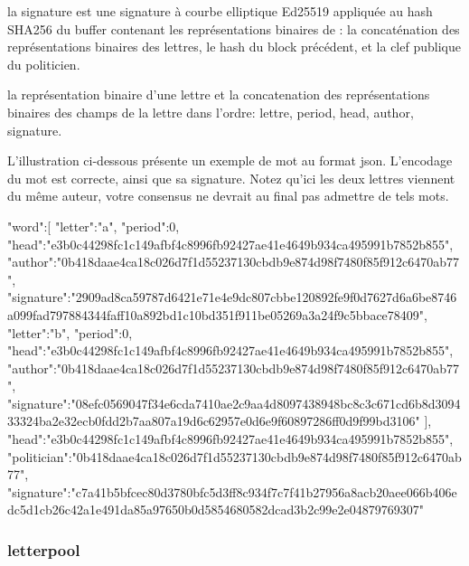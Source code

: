 \documentclass{article}
\begin{document}
 la signature est une signature à courbe elliptique Ed25519 appliquée
 au hash SHA256 du buffer contenant les représentations binaires de :
 la concaténation des représentations binaires des lettres, le hash du
 block précédent, et la clef publique du politicien.

 la représentation binaire d'une lettre et la concatenation des
 représentations binaires des champs de la lettre dans l'ordre:
 lettre, period, head, author, signature.

 L'illustration ci-dessous présente un exemple de mot au
 format json. L'encodage du mot est correcte, ainsi que sa
 signature. Notez qu'ici les deux lettres viennent du même auteur,
 votre consensus ne devrait au final pas admettre de tels mots.

\begin{jsonMessage}
   { "word":[ { "letter":"a", "period":0,
       "head":"e3b0c44298fc1c149afbf4c8996fb92427ae41e4649b934ca495991b7852b855",
       "author":"0b418daae4ca18c026d7f1d55237130cbdb9e874d98f7480f85f912c6470ab77",
       "signature":"2909ad8ca59787d6421e71e4e9dc807cbbe120892fe9f0d7627d6a6be8746a099fad797884344faff10a892bd1c10bd351f911be05269a3a24f9c5bbace78409"},
     { "letter":"b", "period":0,
       "head":"e3b0c44298fc1c149afbf4c8996fb92427ae41e4649b934ca495991b7852b855",
       "author":"0b418daae4ca18c026d7f1d55237130cbdb9e874d98f7480f85f912c6470ab77",
       "signature":"08efc0569047f34e6cda7410ae2c9aa4d8097438948bc8c3c671cd6b8d309433324ba2e32ecb0fdd2b7aa807a19d6c62957e0d6e9f60897286ff0d9f99bd3106"}
     ],
     "head":"e3b0c44298fc1c149afbf4c8996fb92427ae41e4649b934ca495991b7852b855",
     "politician":"0b418daae4ca18c026d7f1d55237130cbdb9e874d98f7480f85f912c6470ab77",
     "signature":"c7a41b5bfcec80d3780bfc5d3ff8c934f7c7f41b27956a8acb20aee066b406edc5d1cb26c42a1e491da85a97650b0d5854680582dcad3b2c99e2e04879769307"}
\end{jsonMessage}


 \subsubsection{letterpool}
 \label{sec:letterpool}
\end{document}
